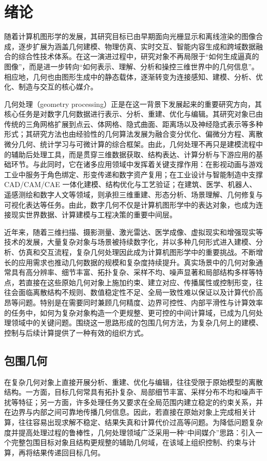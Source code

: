 \chapter{绪论}

\providecommand{\eqref}[1]{(\ref{#1})}
\providecommand{\mathbb}[1]{\mathbf{#1}}

随着计算机图形学的发展，其研究目标已由早期面向光栅显示和离线渲染的图像合成，逐步扩展为涵盖几何建模、物理仿真、实时交互、智能内容生成和跨域数据融合的综合性技术体系。在这一演进过程中，研究对象不再局限于“如何生成逼真的图像”，而是进一步转向“如何表示、理解、分析和操控三维世界中的几何信息”。相应地，几何也由图形生成中的静态载体，逐渐转变为连接感知、建模、分析、优化、制造与交互的核心媒介。

几何处理（geometry processing）正是在这一背景下发展起来的重要研究方向，其核心任务是对数字几何数据进行表示、分析、重建、优化与编辑。其研究对象已由传统的三角网格扩展到点云、体网格、隐式曲面、距离场以及神经隐式表示等多种形式；其研究方法也由经验性的几何算法发展为融合变分优化、偏微分方程、离散微分几何、统计学习与可微计算的综合框架。由此，几何处理不再只是建模流程中的辅助后处理工具，而是贯穿三维数据获取、结构表达、计算分析与下游应用的基础环节。与此同时，它在诸多应用领域中发挥着关键支撑作用：在影视动画与游戏工业中服务于角色绑定、形变传递和数字资产复用；在工业设计与智能制造中支撑 CAD/CAM/CAE 一体化建模、结构优化与工艺验证；在建筑、医学、机器人、遥感测绘和数字人文等领域，则承担三维重建、形态分析、场景理解、几何修复与可视化表达等任务。由此，数字几何不仅是计算机图形学中的表达对象，也成为连接现实世界数据、计算建模与工程决策的重要中间层。

近年来，随着三维扫描、摄影测量、激光雷达、医学成像、虚拟现实和增强现实等技术的发展，大量复杂对象与场景被持续数字化，并以多种几何形式进入建模、分析、仿真和交互流程，复杂几何处理因此成为计算机图形学中的重要挑战。不断增长的应用需求也推动几何数据的规模和复杂度持续提升。真实场景中的几何对象通常具有高分辨率、细节丰富、拓扑复杂、采样不均、噪声显著和局部结构多样等特点，若直接在这些原始几何对象上施加约束、建立对应、传播属性或控制形变，往往会面临离散结构不规则、数值稳定性不足、全局一致性难以保证以及计算代价高昂等问题。特别是在需要同时兼顾几何精度、边界可控性、内部平滑性与计算效率的任务中，如何为复杂对象构造一个更规整、更可控的中间计算域，已成为几何处理领域中的关键问题。围绕这一思路形成的包围几何方法，为复杂几何上的建模、控制与后续计算提供了一种有效的组织方式。


\section{包围几何}
在复杂几何对象上直接开展分析、重建、优化与编辑，往往受限于原始模型的离散结构。一方面，目标几何常具有拓扑复杂、局部细节丰富、采样分布不均和噪声干扰等特征；另一方面，许多处理任务又要求在全局范围内建立稳定的约束关系，并在边界与内部之间可靠地传播几何信息。因此，若直接在原始对象上完成相关计算，往往容易出现求解不稳定、结果失真和计算代价过高等问题。为降低问题复杂度并提高处理过程的鲁棒性，几何处理领域广泛采用一种“中间媒介”思路：引入一个完整包围目标对象且结构更规整的辅助几何域，在该域上组织控制、约束与计算，再将结果传递回目标几何。

